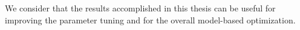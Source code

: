     We consider that the results accomplished in this thesis can be useful for improving the parameter tuning and for the overall model-based optimization.























